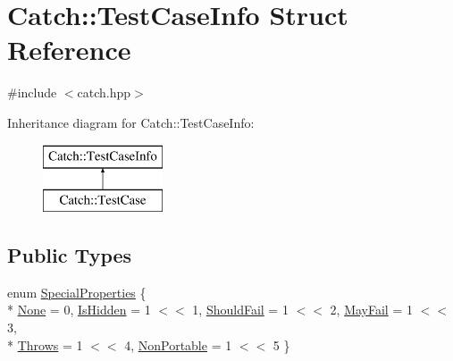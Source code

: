 \hypertarget{structCatch_1_1TestCaseInfo}{\section{Catch\-:\-:Test\-Case\-Info Struct Reference}
\label{structCatch_1_1TestCaseInfo}
}


{\ttfamily \#include $<$catch.\-hpp$>$}

Inheritance diagram for Catch\-:\-:Test\-Case\-Info\-:\begin{figure}[H]
\begin{center}
\leavevmode
\includegraphics[height=2.000000cm]{structCatch_1_1TestCaseInfo}
\end{center}
\end{figure}
\subsection*{Public Types}
\begin{DoxyCompactItemize}
\item 
enum \hyperlink{structCatch_1_1TestCaseInfo_a39b232f74b4a7a6f2183b96759027eac}{Special\-Properties} \{ \\*
\hyperlink{structCatch_1_1TestCaseInfo_a39b232f74b4a7a6f2183b96759027eacaf94e9de5f8ec1e53b1aa761ec564b31a}{None} = 0, 
\hyperlink{structCatch_1_1TestCaseInfo_a39b232f74b4a7a6f2183b96759027eacaeda53906c14c3973e0980900c132b8f7}{Is\-Hidden} = 1 $<$$<$ 1, 
\hyperlink{structCatch_1_1TestCaseInfo_a39b232f74b4a7a6f2183b96759027eacaf9002285bccfc343935958f3953f4c01}{Should\-Fail} = 1 $<$$<$ 2, 
\hyperlink{structCatch_1_1TestCaseInfo_a39b232f74b4a7a6f2183b96759027eacadf1873d3271121cb9f52d7df45b416ca}{May\-Fail} = 1 $<$$<$ 3, 
\\*
\hyperlink{structCatch_1_1TestCaseInfo_a39b232f74b4a7a6f2183b96759027eaca4704adf89ed7f7ad653d08f99813a974}{Throws} = 1 $<$$<$ 4, 
\hyperlink{structCatch_1_1TestCaseInfo_a39b232f74b4a7a6f2183b96759027eaca06472887b53fda9eb8015d74e7fd2cf1}{Non\-Portable} = 1 $<$$<$ 5
 \}
\end{DoxyCompactItemize}
